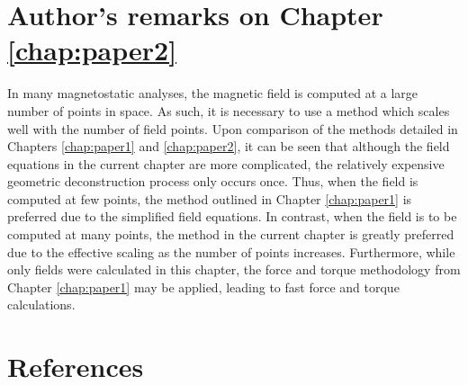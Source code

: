 \section*{Author's remarks on Chapter \ref{chap:paper2}}
In many magnetostatic analyses, the magnetic field is computed at a large number of points in space. As such, it is necessary to use a method which scales well with the number of field points. Upon comparison of the methods detailed in Chapters \ref{chap:paper1} and \ref{chap:paper2}, it can be seen that although the field equations in the current chapter are more complicated, the relatively expensive geometric deconstruction process only occurs once. Thus, when the field is computed at few points, the method outlined in Chapter \ref{chap:paper1} is preferred due to the simplified field equations. In contrast, when the field is to be computed at many points, the method in the current chapter is greatly preferred due to the effective scaling as the number of points increases. Furthermore, while only fields were calculated in this chapter, the force and torque methodology from Chapter \ref{chap:paper1} may be applied, leading to fast force and torque calculations.

\newpage
\section*{References}
\printbibliography[heading=none]